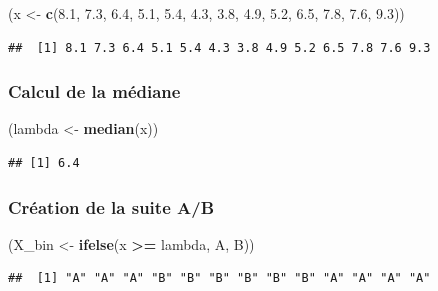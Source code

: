 \documentclass[
  12pt,
]{article}
\newenvironment{Shaded}{\begin{snugshade}}{\end{snugshade}}
\newcommand{\FloatTok}[1]{\textcolor[rgb]{0.00,0.00,0.81}{#1}}
\newcommand{\FunctionTok}[1]{\textcolor[rgb]{0.13,0.29,0.53}{\textbf{#1}}}
\newcommand{\NormalTok}[1]{#1}
\newcommand{\OtherTok}[1]{\textcolor[rgb]{0.56,0.35,0.01}{#1}}
\newcommand{\SpecialCharTok}[1]{\textcolor[rgb]{0.81,0.36,0.00}{\textbf{#1}}}
\newcommand{\StringTok}[1]{\textcolor[rgb]{0.31,0.60,0.02}{#1}}
\begin{document}
\begin{Shaded}
\begin{Highlighting}[]
\NormalTok{(x }\OtherTok{\textless{}{-}} \FunctionTok{c}\NormalTok{(}\FloatTok{8.1}\NormalTok{, }\FloatTok{7.3}\NormalTok{, }\FloatTok{6.4}\NormalTok{, }\FloatTok{5.1}\NormalTok{, }\FloatTok{5.4}\NormalTok{, }\FloatTok{4.3}\NormalTok{, }\FloatTok{3.8}\NormalTok{, }\FloatTok{4.9}\NormalTok{, }\FloatTok{5.2}\NormalTok{, }\FloatTok{6.5}\NormalTok{, }\FloatTok{7.8}\NormalTok{, }\FloatTok{7.6}\NormalTok{, }\FloatTok{9.3}\NormalTok{))}
\end{Highlighting}
\end{Shaded}

\begin{verbatim}
##  [1] 8.1 7.3 6.4 5.1 5.4 4.3 3.8 4.9 5.2 6.5 7.8 7.6 9.3
\end{verbatim}

\subsubsection{Calcul de la médiane}\label{calcul-de-la-muxe9diane}

\begin{Shaded}
\begin{Highlighting}[]
\NormalTok{(lambda }\OtherTok{\textless{}{-}} \FunctionTok{median}\NormalTok{(x))}
\end{Highlighting}
\end{Shaded}

\begin{verbatim}
## [1] 6.4
\end{verbatim}

\subsubsection{Création de la suite
A/B}\label{cruxe9ation-de-la-suite-ab}

\begin{Shaded}
\begin{Highlighting}[]
\NormalTok{(X\_bin }\OtherTok{\textless{}{-}} \FunctionTok{ifelse}\NormalTok{(x }\SpecialCharTok{\textgreater{}=}\NormalTok{ lambda, }\StringTok{\textquotesingle{}A\textquotesingle{}}\NormalTok{, }\StringTok{\textquotesingle{}B\textquotesingle{}}\NormalTok{))}
\end{Highlighting}
\end{Shaded}

\begin{verbatim}
##  [1] "A" "A" "A" "B" "B" "B" "B" "B" "B" "A" "A" "A" "A"
\end{verbatim}
\end{document}
